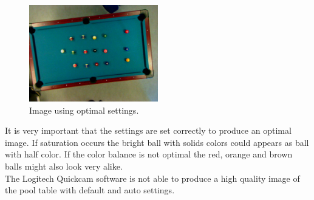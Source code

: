 \begin{figure}[H]
\begin{center}
\leavevmode
\includegraphics[width=0.5\textwidth]{images/good-from-program}
\end{center}
\caption{Image using optimal settings.}
\label{fig:bestimgcamera}
\end{figure} 

It is very important that the settings are set correctly to produce an optimal image. If saturation occurs the bright ball with solids colors could appears as ball with half color. If the color balance is not optimal the red, orange and brown balls might also look very alike.\\

The Logitech Quickcam software is not able to produce a high quality image of the pool table with default and auto settings.

